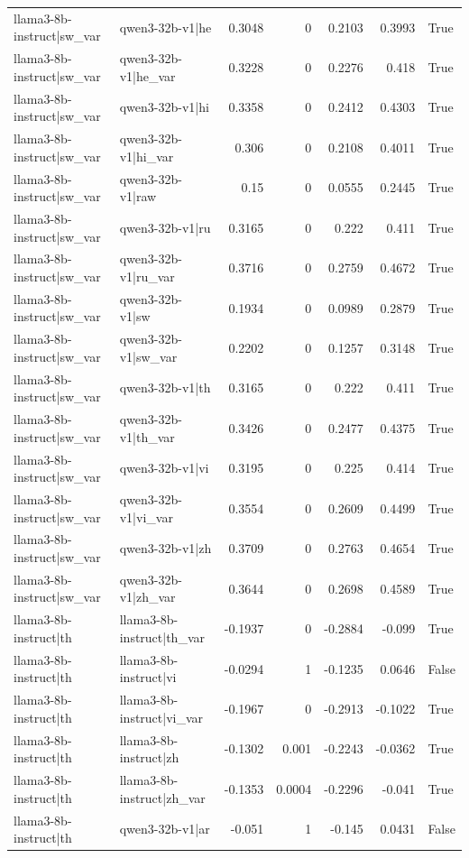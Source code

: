 \begin{table}
\begin{tabular}{l l r r r r l}
llama3-8b-instruct|sw_var & qwen3-32b-v1|he & 0.3048 & 0 & 0.2103 & 0.3993 & True \\
llama3-8b-instruct|sw_var & qwen3-32b-v1|he_var & 0.3228 & 0 & 0.2276 & 0.418 & True \\
llama3-8b-instruct|sw_var & qwen3-32b-v1|hi & 0.3358 & 0 & 0.2412 & 0.4303 & True \\
llama3-8b-instruct|sw_var & qwen3-32b-v1|hi_var & 0.306 & 0 & 0.2108 & 0.4011 & True \\
llama3-8b-instruct|sw_var & qwen3-32b-v1|raw & 0.15 & 0 & 0.0555 & 0.2445 & True \\
llama3-8b-instruct|sw_var & qwen3-32b-v1|ru & 0.3165 & 0 & 0.222 & 0.411 & True \\
llama3-8b-instruct|sw_var & qwen3-32b-v1|ru_var & 0.3716 & 0 & 0.2759 & 0.4672 & True \\
llama3-8b-instruct|sw_var & qwen3-32b-v1|sw & 0.1934 & 0 & 0.0989 & 0.2879 & True \\
llama3-8b-instruct|sw_var & qwen3-32b-v1|sw_var & 0.2202 & 0 & 0.1257 & 0.3148 & True \\
llama3-8b-instruct|sw_var & qwen3-32b-v1|th & 0.3165 & 0 & 0.222 & 0.411 & True \\
llama3-8b-instruct|sw_var & qwen3-32b-v1|th_var & 0.3426 & 0 & 0.2477 & 0.4375 & True \\
llama3-8b-instruct|sw_var & qwen3-32b-v1|vi & 0.3195 & 0 & 0.225 & 0.414 & True \\
llama3-8b-instruct|sw_var & qwen3-32b-v1|vi_var & 0.3554 & 0 & 0.2609 & 0.4499 & True \\
llama3-8b-instruct|sw_var & qwen3-32b-v1|zh & 0.3709 & 0 & 0.2763 & 0.4654 & True \\
llama3-8b-instruct|sw_var & qwen3-32b-v1|zh_var & 0.3644 & 0 & 0.2698 & 0.4589 & True \\
llama3-8b-instruct|th & llama3-8b-instruct|th_var & -0.1937 & 0 & -0.2884 & -0.099 & True \\
llama3-8b-instruct|th & llama3-8b-instruct|vi & -0.0294 & 1 & -0.1235 & 0.0646 & False \\
llama3-8b-instruct|th & llama3-8b-instruct|vi_var & -0.1967 & 0 & -0.2913 & -0.1022 & True \\
llama3-8b-instruct|th & llama3-8b-instruct|zh & -0.1302 & 0.001 & -0.2243 & -0.0362 & True \\
llama3-8b-instruct|th & llama3-8b-instruct|zh_var & -0.1353 & 0.0004 & -0.2296 & -0.041 & True \\
llama3-8b-instruct|th & qwen3-32b-v1|ar & -0.051 & 1 & -0.145 & 0.0431 & False \\

\end{tabular}
\end{table}
